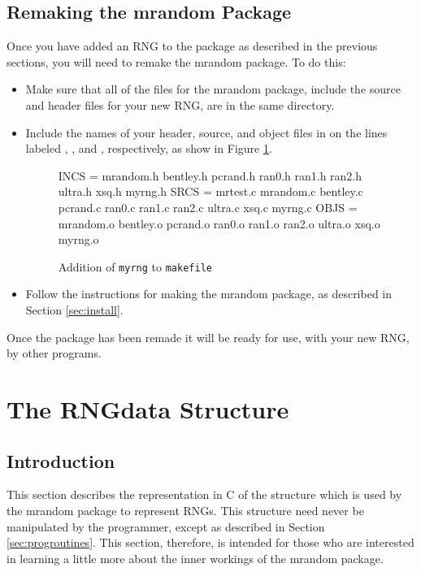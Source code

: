 \subsection{Remaking the mrandom Package}
	Once you have added an RNG to the package as described in the
previous sections, you will need to remake the mrandom package.  To do
this:
\begin{itemize}
\item Make sure that all of the files for the mrandom package,
include the source and header files for your new RNG, are in the
same directory.

\item Include the names of your header, source, and object files in
 on the lines labeled , , and
, respectively, as show in Figure \ref{fig:addmake}.

\begin{figure}
\begin{example}
INCS = mrandom.h bentley.h pcrand.h ran0.h ran1.h ran2.h ultra.h xsq.h myrng.h
SRCS = mrtest.c mrandom.c bentley.c pcrand.c ran0.c ran1.c ran2.c ultra.c xsq.c myrng.c
OBJS = mrandom.o bentley.o pcrand.o ran0.o ran1.o ran2.o ultra.o xsq.o myrng.o
\end{example}
\caption{Addition of {\tt myrng} to {\tt makefile}}
\label{fig:addmake}
\end{figure}

\item Follow the instructions for making the mrandom package, as
described in Section \ref{sec:install}.
\end{itemize}
Once the package has been remade it will be ready for use, with your new
RNG, by other programs.

\pagebreak
\appendix
\section{The RNGdata Structure}
\label{app:rngdata}
\subsection{Introduction}
This section describes the representation in C of the 
structure which is used by the mrandom package to represent RNGs.  This
structure need never be manipulated by the programmer, except as
described in Section \ref{sec:progroutines}.  This section, therefore,
is intended for those who are interested in learning a little more about
the inner workings of the mrandom package.

